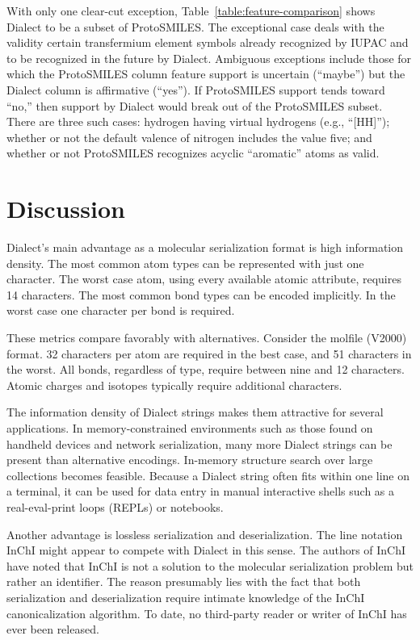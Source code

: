 \documentclass{article}
\begin{document}
With only one clear-cut exception, Table~\ref{table:feature-comparison} shows Dialect to be a subset of ProtoSMILES. The exceptional case deals with the validity certain transfermium element symbols already recognized by IUPAC and to be recognized in the future by Dialect. Ambiguous exceptions include those for which the ProtoSMILES column feature support is uncertain (\enquote{maybe}) but the Dialect column is affirmative (\enquote{yes}). If ProtoSMILES support tends toward \enquote{no,} then support by Dialect would break out of the ProtoSMILES subset. There are three such cases: hydrogen having virtual hydrogens (e.g., \enquote{[HH]}); whether or not the default valence of nitrogen includes the value five; and whether or not ProtoSMILES recognizes acyclic \enquote{aromatic} atoms as valid.

\section*{Discussion}

Dialect's main advantage as a molecular serialization format is high information density. The most common atom types can be represented with just one character. The worst case atom, using every available atomic attribute, requires 14 characters. The most common bond types can be encoded implicitly. In the worst case one character per bond is required.

These metrics compare favorably with alternatives. Consider the molfile (V2000) format. 32 characters per atom are required in the best case, and 51 characters in the worst. All bonds, regardless of type, require between nine and 12 characters. Atomic charges and isotopes typically require additional characters.

The information density of Dialect strings makes them attractive for several applications. In memory-constrained environments such as those found on handheld devices and network serialization, many more Dialect strings can be present than alternative encodings. In-memory structure search over large collections becomes feasible. Because a Dialect string often fits within one line on a terminal, it can be used for data entry in manual interactive shells such as a real-eval-print loops (REPLs) or notebooks.

Another advantage is lossless serialization and deserialization. The line notation InChI might appear to compete with Dialect in this sense. The authors of InChI have noted that InChI is not a solution to the molecular serialization problem but rather an identifier.\cite{heller:2015} The reason presumably lies with the fact that both serialization and deserialization require intimate knowledge of the InChI canonicalization algorithm. To date, no third-party reader or writer of InChI has ever been released.
\end{document}
